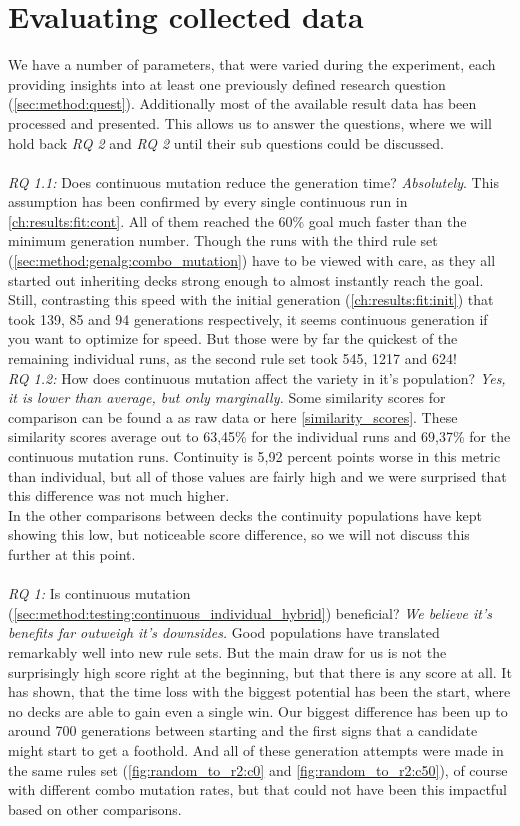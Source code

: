 \section{Evaluating collected data}
\label{ch:results:eval}
We have a number of parameters, that were varied during the experiment, each providing insights into at least one previously defined research question (\ref{sec:method:quest}). Additionally most of the available result data has been processed and presented. This allows us to answer the questions, where we will hold back \emph{RQ 2} and \emph{RQ 2} until their sub questions could be discussed. \\
\\
	\emph{RQ 1.1:} Does continuous mutation reduce the generation time?
\emph{Absolutely}. This assumption has been confirmed by every single continuous run in \ref{ch:results:fit:cont}. All of them reached the 60\% goal much faster than the minimum generation number. Though the runs with the third rule set (\ref{sec:method:genalg:combo_mutation}) have to be viewed with care, as they all started out inheriting decks strong enough to almost instantly reach the goal. Still, contrasting this speed with the initial generation (\ref{ch:results:fit:init}) that took 139, 85 and 94 generations respectively, it seems continuous generation if you want to optimize for speed. But those were by far the quickest of the remaining individual runs, as the second rule set took 545, 1217 and 624! 
\\
	\emph{RQ 1.2:} How does continuous mutation affect the variety in it's population?
\emph{Yes, it is lower than average, but only marginally.} Some similarity scores for comparison can be found a as raw data or here \ref{similarity_scores}.
These similarity scores average out to 63,45\% for the individual runs and 69,37\% for the continuous mutation runs. Continuity is 5,92 percent points worse in this metric than individual, but all of those values are fairly high and we were surprised that this difference was not much higher.\\
In the other comparisons between decks the continuity populations have kept showing this low, but noticeable score difference, so we will not discuss this further at this point.
\\
\\
	\emph{RQ 1:} Is continuous mutation (\ref{sec:method:testing:continuous_individual_hybrid}) beneficial?
\emph{We believe it's benefits far outweigh it's downsides.} Good populations have translated remarkably well into new rule sets. But the main draw for us is not the surprisingly high score right at the beginning, but that there is any score at all. It has shown, that the time loss with the biggest potential has been the start, where no decks are able to gain even a single win. Our biggest difference has been up to around 700 generations between starting and the first signs that a candidate might start to get a foothold. And all of these generation attempts were made in the same rules set (\ref{fig:random_to_r2:c0} and \ref{fig:random_to_r2:c50}), of course with different combo mutation rates, but that could not have been this impactful based on other comparisons.\\

